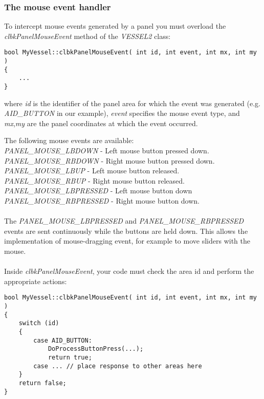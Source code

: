 \documentclass[Orbiter Developer Manual.tex]{subfiles}
\begin{document}
\subsubsection{The mouse event handler}
To intercept mouse events generated by a panel you must overload the \textit{clbkPanelMouseEvent} method of the \textit{VESSEL2} class:

\begin{lstlisting}
bool MyVessel::clbkPanelMouseEvent( int id, int event, int mx, int my )
{
	...
}
\end{lstlisting}

\noindent
where \textit{id} is the identifier of the panel area for which the event was generated (e.g. \textit{AID\_BUTTON} in our example), \textit{event} specifies the mouse event type, and \textit{mx},\textit{my} are the panel coordinates at which the event occurred.


The following mouse events are available:\\
\textit{PANEL\_MOUSE\_LBDOWN} - Left mouse button pressed down.\\
\textit{PANEL\_MOUSE\_RBDOWN} - Right mouse button pressed down.\\
\textit{PANEL\_MOUSE\_LBUP} - Left mouse button released.\\
\textit{PANEL\_MOUSE\_RBUP} - Right mouse button released.\\
\textit{PANEL\_MOUSE\_LBPRESSED} - Left mouse button down\\
\textit{PANEL\_MOUSE\_RBPRESSED} - Right mouse button down.\\
\\
The \textit{PANEL\_MOUSE\_LBPRESSED} and \textit{PANEL\_MOUSE\_RBPRESSED} events are sent continuously while the buttons are held down. This allows the implementation of mouse-dragging event, for example to move sliders with the mouse.\\
\\
Inside \textit{clbkPanelMouseEvent}, your code must check the area id and perform the appropriate actions:

\begin{lstlisting}
bool MyVessel::clbkPanelMouseEvent( int id, int event, int mx, int my )
{
	switch (id)
	{
		case AID_BUTTON:
			DoProcessButtonPress(...);
			return true;
		case ... // place response to other areas here
	}
	return false;
}
\end{lstlisting}
\end{document}
